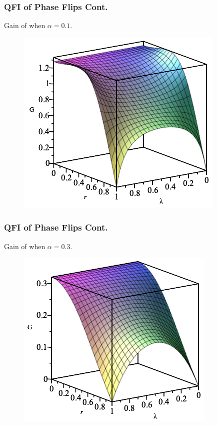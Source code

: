 \documentclass{beamer}
\begin{document}
\begin{frame}
\frametitle{QFI of Phase Flips Cont.}
Gain of when $\alpha=0.1$.
\begin{figure}
\begin{center}
\includegraphics[width=0.75\linewidth]{Phase-Flip-Two-Channel-Alpha=01-Gain.png}
\end{center}
\end{figure}
\end{frame}
\begin{frame}
\frametitle{QFI of Phase Flips Cont.}
Gain of when $\alpha=0.3$.
\begin{figure}
\begin{center}
\includegraphics[width=0.75\linewidth]{Phase-Flip-Two-Channel-Alpha=03-Gain.png}
\end{center}
\end{figure}
\end{frame}
\end{document}
